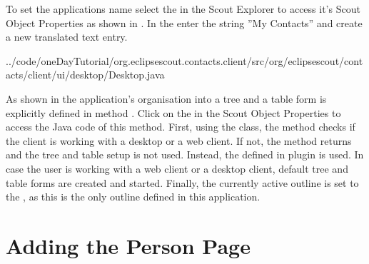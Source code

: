 \documentclass[a4paper,10pt,twoside]{book}
\begin{document}
To set the applications name select the  in the Scout Explorer to access it's Scout Object Properties as shown in .
In the  enter the string ''My Contacts'' and create a new translated text entry.  


{../code/oneDayTutorial/org.eclipsescout.contacts.client/src/org/eclipsescout/contacts/client/ui/desktop/Desktop.java}

As shown in  the application's organisation into a tree and a table form is explicitly defined in method . 
Click on the  in the Scout Object Properties to access the Java code of this method.
First, using the  class, the method checks if the client is working with a desktop or a web client. 
If not, the method returns and the tree and table setup is not used. 
Instead, the  defined in plugin  is used. 
In case the user is working with a web client or a desktop client, default tree and table forms are created and started. 
Finally, the currently active outline is set to the , as this is the only outline defined in this application.

\section{Adding the Person Page}
\end{document}
